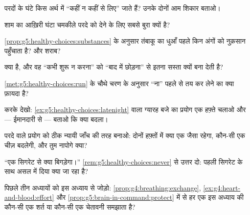 \begin{exercise}[$\star$]\label{exo:g5:healthy-choices:3}
परदों के घंटे किस अर्थ में ``कहीं न कहीं से लिए'' जाते हैं? उनके दोनों
आम शिकार बताओ।
\end{exercise}

\begin{exercise}[$\star$]\label{exo:g5:healthy-choices:4}
शाम का आख़िरी घंटा चमकीले परदे को देने के लिए सबसे बुरा क्यों है?
\end{exercise}

\begin{exercise}[$\star$]\label{exo:g5:healthy-choices:5}
\cref{prop:g5:healthy-choices:substances} के अनुसार तंबाकू का धुआँ पहले
किन अंगों को नुक़सान पहुँचाता है? और शराब?
\end{exercise}

\begin{exercise}[$\star$]\label{exo:g5:healthy-choices:6}
 क्या है, और वह ``कभी शुरू न करना'' को ``बाद में छोड़ना'' से इतना
सस्ता क्यों बना देती है?
\end{exercise}

\begin{exercise}[$\star$]\label{exo:g5:healthy-choices:7}
\cref{met:g5:healthy-choices:run} के चौथे चरण के अनुसार ``ना'' पहले से
तय कर लेने का क्या फ़ायदा है?
\end{exercise}

\begin{exercise}[$\star$]\label{exo:g5:healthy-choices:8}
करके देखो: \cref{ex:g5:healthy-choices:latenight} वाला ग्यारह बजे का
प्रयोग एक हफ़्ते चलाओ और --- ईमानदारी से --- बताओ कि क्या बदला।
\end{exercise}

\begin{exercise}[$\star\star$]\label{exo:g5:healthy-choices:9}
परदे वाले प्रयोग को ठीक न्यायी जाँच की तरह बनाओ: दोनों हफ़्तों में क्या
एक जैसा रहेगा, कौन-सी एक चीज़ बदलेगी, और तुम नापोगे क्या?
\end{exercise}

\begin{exercise}[$\star\star$]\label{exo:g5:healthy-choices:10}
``एक सिगरेट से क्या बिगड़ेगा।''
\cref{rem:g5:healthy-choices:never} से उत्तर दो: पहली सिगरेट के साथ
असल में दिया क्या जा रहा है?
\end{exercise}

\begin{exercise}[$\star\star\star$]\label{exo:g5:healthy-choices:11}
पिछले तीन अध्यायों को इस अध्याय से जोड़ो:
\cref{prop:g4:breathing:exchange},
\cref{ex:g4:heart-and-blood:effort} और
\cref{prop:g5:brain-in-command:protect} में से हर एक इस अध्याय की
कौन-सी एक शर्त या कौन-सी एक चेतावनी समझाता है?
\end{exercise}
